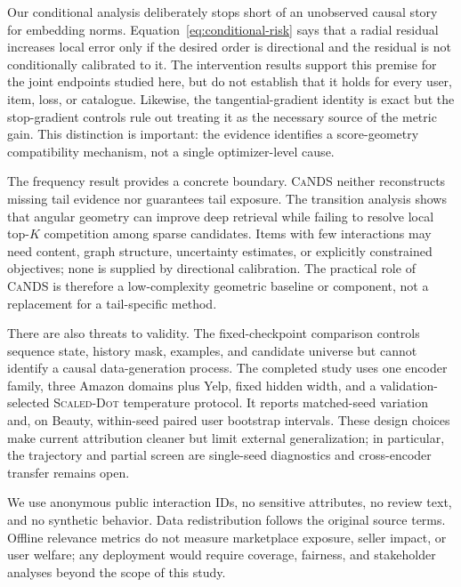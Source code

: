 \documentclass[sigconf,anonymous,review]{acmart}
\newcommand{\cands}{\textsc{CaNDS}}
\newcommand{\scaledot}{\textsc{Scaled-Dot}}
\begin{document}
Our conditional analysis deliberately stops short of an unobserved causal story for embedding norms. Equation~\ref{eq:conditional-risk} says that a radial residual increases local error only if the desired order is directional and the residual is not conditionally calibrated to it. The intervention results support this premise for the joint endpoints studied here, but do not establish that it holds for every user, item, loss, or catalogue. Likewise, the tangential-gradient identity is exact but the stop-gradient controls rule out treating it as the necessary source of the metric gain. This distinction is important: the evidence identifies a score-geometry compatibility mechanism, not a single optimizer-level cause.

The frequency result provides a concrete boundary. \cands{} neither reconstructs missing tail evidence nor guarantees tail exposure. The transition analysis shows that angular geometry can improve deep retrieval while failing to resolve local top-$K$ competition among sparse candidates. Items with few interactions may need content, graph structure, uncertainty estimates, or explicitly constrained objectives; none is supplied by directional calibration. The practical role of \cands{} is therefore a low-complexity geometric baseline or component, not a replacement for a tail-specific method.

There are also threats to validity. The fixed-checkpoint comparison controls sequence state, history mask, examples, and candidate universe but cannot identify a causal data-generation process. The completed study uses one encoder family, three Amazon domains plus Yelp, fixed hidden width, and a validation-selected \scaledot{} temperature protocol. It reports matched-seed variation and, on Beauty, within-seed paired user bootstrap intervals. These design choices make current attribution cleaner but limit external generalization; in particular, the trajectory and partial screen are single-seed diagnostics and cross-encoder transfer remains open.

We use anonymous public interaction IDs, no sensitive attributes, no review text, and no synthetic behavior. Data redistribution follows the original source terms. Offline relevance metrics do not measure marketplace exposure, seller impact, or user welfare; any deployment would require coverage, fairness, and stakeholder analyses beyond the scope of this study.
\end{document}

